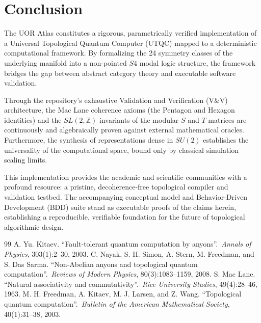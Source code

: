 \section{Conclusion}

The UOR Atlas constitutes a rigorous, parametrically verified implementation of a Universal Topological Quantum Computer (UTQC) mapped to a deterministic computational framework. By formalizing the 24 symmetry classes of the underlying manifold into a non-pointed $S4$ modal logic structure, the framework bridges the gap between abstract category theory and executable software validation.

Through the repository's exhaustive Validation and Verification (V\&V) architecture, the Mac Lane coherence axioms (the Pentagon and Hexagon identities) and the $SL(2, \mathbb{Z})$ invariants of the modular $S$ and $T$ matrices are continuously and algebraically proven against external mathematical oracles. Furthermore, the synthesis of representations dense in $SU(2)$ establishes the universality of the computational space, bound only by classical simulation scaling limits.

This implementation provides the academic and scientific communities with a profound resource: a pristine, decoherence-free topological compiler and validation testbed. The accompanying conceptual model and Behavior-Driven Development (BDD) suite stand as executable proofs of the claims herein, establishing a reproducible, verifiable foundation for the future of topological algorithmic design.

\begin{thebibliography}{99}
A. Yu. Kitaev. ``Fault-tolerant quantum computation by anyons''.\ \textit{Annals of Physics}, 303(1):2--30, 2003.
C. Nayak, S. H. Simon, A. Stern, M. Freedman, and S. Das Sarma. ``Non-Abelian anyons and topological quantum computation''.\ \textit{Reviews of Modern Physics}, 80(3):1083--1159, 2008.
S. Mac Lane. ``Natural associativity and commutativity''.\ \textit{Rice University Studies}, 49(4):28--46, 1963.
M. H. Freedman, A. Kitaev, M. J. Larsen, and Z. Wang. ``Topological quantum computation''.\ \textit{Bulletin of the American Mathematical Society}, 40(1):31--38, 2003.
\end{thebibliography}
